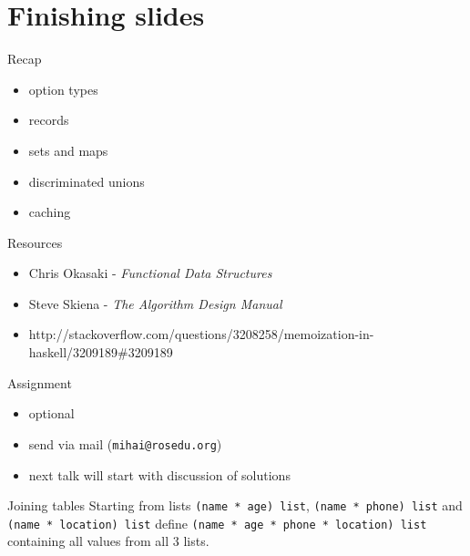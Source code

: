 \documentclass{beamer}
\begin{document}
\section{Finishing slides}
\frame{\tableofcontents[currentsection]}

\begin{frame}{Recap}
  \begin{itemize}[<+->]
    \item option types
    \item records
    \item sets and maps
    \item discriminated unions
    \item caching
  \end{itemize}
\end{frame}

\begin{frame}{Resources}
  \begin{itemize}
    \item Chris Okasaki - \textit{Functional Data Structures}
    \item Steve Skiena - \textit{The Algorithm Design Manual}
    \item
    http://stackoverflow.com/questions/3208258/memoization-in-haskell/3209189\#3209189
  \end{itemize}
\end{frame}

\begin{frame}[fragile]{Assignment}
  \begin{itemize}
    \item optional
    \item send via mail (\texttt{mihai@rosedu.org})
    \item next talk will start with discussion of solutions
  \end{itemize}
  \pause
  \begin{block}{Joining tables}
  Starting from lists \texttt{(name * age) list}, \texttt{(name * phone) list}
and \texttt{(name * location) list} define \texttt{(name * age * phone *
location) list} containing all values from all 3 lists.
  \end{block}
\end{frame}
\end{document}
